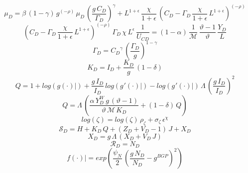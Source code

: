 \documentclass[10pt,a4paper]{article}
\begin{document}
\begin{dmath}
{{\mu}_{D}}=\beta\, \left(1-\gamma\right)\, {g}^{\left(-\rho\right)}\, {{\mu}_{D}}\, \left(\frac{{g}\, {C_D}}{{\Gamma_D}}\right)^{\gamma}+{L}^{1+\epsilon}\, \frac{\chi}{1+\epsilon}\, \left({C_D}-{\Gamma_D}\, \frac{\chi}{1+\epsilon}\, {L}^{1+\epsilon}\right)^{\left(-\rho\right)}
\end{dmath}
\begin{dmath}
\left({C_D}-{\Gamma_D}\, \frac{\chi}{1+\epsilon}\, {L}^{1+\epsilon}\right)^{\left(-\rho\right)}\, {\Gamma_D}\, \chi\, {L}^{\epsilon}\, \frac{1}{{U_{CD}}}=\left(1-\alpha\right)\, \frac{1}{\mathcal{M}}\, \frac{\vartheta-1}{\vartheta}\, \frac{{Y_D}}{{L}}
\end{dmath}
\begin{dmath}
{\Gamma_D}={C_D}^{\gamma}\, \left(\frac{{\Gamma_D}}{{g}}\right)^{1-\gamma}
\end{dmath}
\begin{dmath}
{K_D}={I_D}+\frac{{K_D}}{{g}}\, \left(1-\delta\right)
\end{dmath}
\begin{dmath}
{Q}=1+log\left({\left.       g\left( \cdot \right)            \right|}\right)+\frac{{g}\, {I_D}}{{I_D}}\, log\left({\left.       g^‎{\prime}\left( \cdot \right)   \right|}\right)-log\left({\left.       g^‎{\prime}\left( \cdot \right)   \right|}\right)\, {\Lambda}\, \left(\frac{{g}\, {I_D}}{{I_D}}\right)^{2}
\end{dmath}
\begin{dmath}
{Q}={\Lambda}\, \left(\frac{\alpha\, {Y^W_D}\, {g}\, \left(\vartheta-1\right)}{\vartheta\, \mathcal{M}\, {K_D}}+\left(1-\delta\right)\, {Q}\right)
\end{dmath}
\begin{dmath}
log\left({\zeta}\right)=log\left({\zeta}\right)\, {\rho}_{\zeta}+{\sigma}_{\zeta}\, {\epsilon}^{\chi}
\end{dmath}
\begin{dmath}
{\mathcal{S}_{D}}={H}+{K_D}\, {Q}+\left({Z_D}+{V_D}-1\right)\, {J}+{X_D}
\end{dmath}
\begin{dmath}
{X_D}={g}\, {\Lambda}\, \left({X_D}+{V_D}\, {J}\right)
\end{dmath}
\begin{dmath}
{\mathcal{R}_{D}}={N_D}
\end{dmath}
\begin{dmath}
{\left.       f\left( \cdot \right)            \right|}=exp\left(\frac{\psi_N}{2}\, \left(\frac{{g}\, {N_D}}{{N_D}}-g^{BGP}\right)^{2}\right)
\end{dmath}
\end{document}
